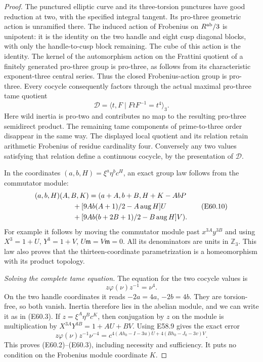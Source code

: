 \begin{proof}
The punctured elliptic curve and its three-torsion punctures
have good reduction at two, with the specified integral
tangent. Its pro-three geometric action is unramified there.
The induced action of Frobenius on $R^{\rm ab}/3$ is
unipotent: it is the identity on the two handle and eight
cusp diagonal blocks, with only the handle-to-cusp block
remaining. The cube of this action is the identity.
The kernel of the automorphism action on the Frattini
quotient of a finitely generated pro-three group is pro-three,
as follows from its characteristic exponent-three central
series. Thus the closed Frobenius-action group is pro-three.
Every cocycle consequently factors through the actual
maximal pro-three tame quotient
\[
       \mathcal D=\langle t,F\mid FtF^{-1}=t^4\rangle_3.
 \tag{E60.9}
\]
Here wild inertia is pro-two and contributes no map to the
resulting pro-three semidirect product. The remaining tame
components of prime-to-three order disappear in the same
way. The displayed local quotient and its relation retain
arithmetic Frobenius of residue cardinality four.
Conversely any two values satisfying that relation define
a continuous cocycle, by the presentation of $\mathcal D$.

In the coordinates $(a,b,H)=\xi^a\eta^b c^H$, an exact
group law follows from the commutator module:
\[
 \begin{split}
 &(a,b,H)(A,B,K)=(a+A,b+B,H+K-AbP\\
 &\hspace{19mm}
   +[9Ab(A+1)/2-A\operatorname{aug}H]U\\
 &\hspace{19mm}
   +[9Ab(b+2B+1)/2-B\operatorname{aug}H]V).
 \end{split}
 \tag{E60.10}
\]
For example it follows by moving the commutator module
past $x^{3A}y^{3B}$ and using
$X^3=1+U$, $Y^3=1+V$, $U\mathfrak m=V\mathfrak m=0$.
All its denominators are units in $\mathbb Z_3$.
This law also proves that the thirteen-coordinate
parametrization is a homeomorphism with its product topology.

\emph{Solving the complete tame equation.}
The equation for the two cocycle values is
\[
                       z\varphi(\nu)z^{-1}=\nu^4.
 \tag{E60.11}
\]
On the two handle coordinates it reads
$-2a=4a$, $-2b=4b$. They are torsion-free, so both vanish.
Inertia therefore lies in the abelian module, and we can
write it as in (E60.3). If $z=\xi^A\eta^B c^K$, then
conjugation by $z$ on the module is multiplication by
$X^{3A}Y^{3B}=1+AU+BV$.
Using E58.9 gives the exact error
\[
 z\varphi(\nu)z^{-1}\nu^{-4}
      =c^{4(Ah_0-I-3u)U+4(Bh_0-J_0-3v)V}.
 \tag{E60.12}
\]
This proves (E60.2)--(E60.3), including necessity and
sufficiency. It puts no condition on the Frobenius module
coordinate $K$.


\end{proof}
